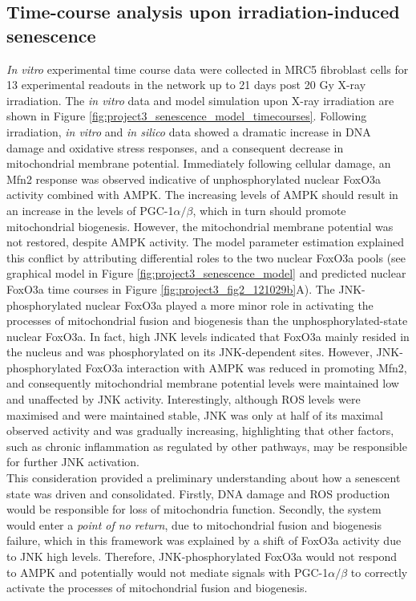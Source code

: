 \subsection{Time-course analysis upon irradiation-induced senescence}
\label{project3-subsec:Time-course analysis upon irradiation-induced senescence}
\emph{In vitro} experimental time course data were collected in MRC5 fibroblast cells for 13 experimental readouts in the network up to 21 days post 20 Gy X-ray irradiation. The \emph{in vitro} data and model simulation upon X-ray irradiation are shown in Figure \ref{fig:project3_senescence_model_timecourses}. Following irradiation, \emph{in vitro} and \emph{in silico} data showed a dramatic increase in DNA damage and oxidative stress responses, and a consequent decrease in mitochondrial membrane potential. Immediately following cellular damage, an Mfn2 response was observed indicative of unphosphorylated nuclear FoxO3a activity combined with AMPK. The increasing levels of AMPK should result in an increase in the levels of PGC-1$\alpha/\beta$, which in turn should promote mitochondrial biogenesis. However, the mitochondrial membrane potential was not restored, despite AMPK activity. The model parameter estimation explained this conflict by attributing differential roles to the two nuclear FoxO3a pools (see 
graphical model in Figure \ref{fig:project3_senescence_model} and predicted nuclear FoxO3a time courses in Figure \ref{fig:project3_fig2_121029b}A). The JNK-phosphorylated nuclear FoxO3a played a more minor role in activating the processes of mitochondrial fusion and biogenesis than the unphosphorylated-state nuclear FoxO3a. In fact, high JNK levels indicated that FoxO3a mainly resided in the nucleus and was phosphorylated on its JNK-dependent sites. However, JNK-phosphorylated FoxO3a interaction with AMPK was reduced in promoting Mfn2, and consequently mitochondrial membrane potential levels were maintained low and unaffected by JNK activity. Interestingly, although ROS levels were maximised and were maintained stable, JNK was only at half of its maximal observed activity and was gradually increasing, highlighting that other factors, such as chronic inflammation as 
regulated by other pathways, may be responsible for further JNK activation. \\
This consideration provided a preliminary understanding about how a senescent state was driven and consolidated. Firstly, DNA damage and ROS production would be responsible for loss of mitochondria function. Secondly, the system would enter a \emph{point of no return}, due to mitochondrial fusion and biogenesis failure, which in this framework was explained by a shift of FoxO3a activity due to JNK high levels. Therefore, JNK-phosphorylated FoxO3a would not respond to AMPK and potentially would not mediate signals with PGC-1$\alpha/\beta$ to correctly activate the processes of mitochondrial fusion and biogenesis. 


